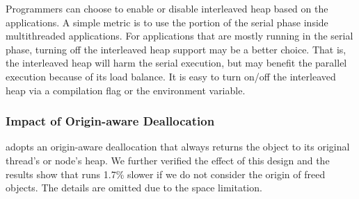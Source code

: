 Programmers can choose to enable or disable interleaved heap based on the applications. A simple metric is to use the portion of the serial phase inside multithreaded applications. For applications that are mostly running in the serial phase, turning off the interleaved heap support may be a better choice. That is, the interleaved heap will harm the serial execution, but may benefit the parallel execution because of its load balance. It is easy to turn on/off the interleaved heap via a compilation flag or the environment variable.  

\subsubsection{Impact of Origin-aware Deallocation}

\NM{} adopts an origin-aware deallocation that always returns the object to its original thread's or node's heap. We further verified the effect of this design and the results show that \NM{} runs 1.7\% slower if we do not consider the origin of freed objects. The details are omitted due to the space limitation. 










